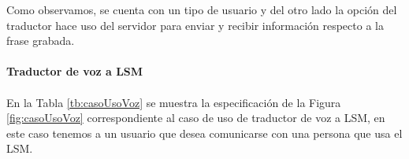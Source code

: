 Como observamos, se cuenta con un tipo de usuario y del otro lado la opción del traductor hace uso del servidor para enviar y recibir información respecto a la frase grabada.

\paragraph{Traductor de voz a LSM}\paragraph{}

En la Tabla \ref{tb:casoUsoVoz} se muestra la especificación de la Figura \ref{fig:casoUsoVoz} correspondiente al caso de uso de traductor de voz a LSM, en este caso tenemos a un usuario que desea comunicarse con una persona que usa el LSM.		

